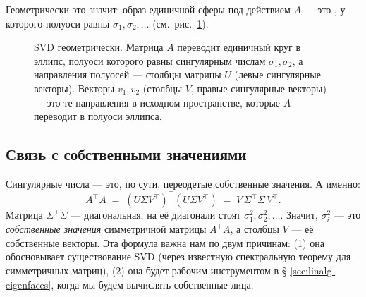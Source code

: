 Геометрически это значит: образ единичной сферы под действием $A$ —
это , у которого полуоси равны $\sigma_1,\sigma_2,\ldots$
(см.~рис.~\ref{fig:svd-ellipse}).

\begin{figure}[ht]
\centering
{}
\caption{SVD геометрически. Матрица $A$ переводит единичный круг
в эллипс, полуоси которого равны сингулярным числам $\sigma_1,\sigma_2$,
а направления полуосей — столбцы матрицы $U$ (левые сингулярные
векторы). Векторы $v_1,v_2$ (столбцы $V$, правые сингулярные
векторы) — это те направления в исходном пространстве, которые
$A$ переводит в полуоси эллипса.}
\label{fig:svd-ellipse}
\end{figure}

\subsection{Связь с собственными значениями}

Сингулярные числа — это, по сути, переодетые собственные значения.
А именно:
\begin{equation}\label{eq:svd-eig}
A^{\!\top} A \;=\; (U\Sigma V^{\!\top})^{\!\top}(U\Sigma V^{\!\top})
\;=\; V\,\Sigma^{\!\top}\Sigma\,V^{\!\top}.
\end{equation}
Матрица $\Sigma^{\!\top}\Sigma$ — диагональная, на её диагонали
стоят $\sigma_1^{2},\sigma_2^{2},\ldots$. Значит, $\sigma_i^{2}$ —
это \emph{собственные значения} симметричной матрицы $A^{\!\top}A$,
а столбцы $V$ — её собственные векторы. Эта формула важна нам
по двум причинам: (1) она обосновывает существование SVD (через
известную спектральную теорему для симметричных матриц),
(2) она будет рабочим инструментом в § \ref{sec:linalg-eigenfaces},
когда мы будем вычислять собственные лица.

